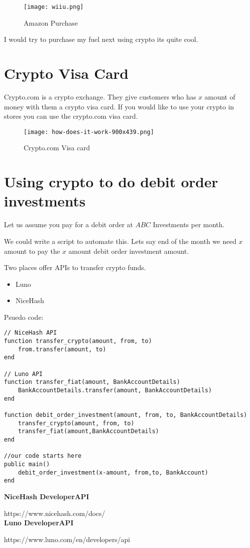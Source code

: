 \begin{figure}[H]
\centering
\texttt{[image: wiiu.png]}
\caption{Amazon Purchase}
\label{fig:amazon}
\end{figure}

I would try to purchase my fuel next using crypto its quite cool.

\section{Crypto Visa Card}
Crypto.com is a crypto exchange. They give customers who has $x$ amount of money with them a crypto visa card. If you would like to use your crypto in stores you can use the crypto.com visa card.

\begin{figure}[H]
\centering
\texttt{[image: how-does-it-work-900x439.png]}
\caption{Crypto.com Visa card}
\label{fig:crypto}
\end{figure}

\section{Using crypto to do debit order investments}
Let us assume you pay for a debit order at $ABC$ Investments per month.

We could write a script to automate this. Lets say end of the month we need $x$ amount to pay the $x$ amount debit order investment amount.

Two places offer APIs to transfer crypto funds.

\begin{itemize}
\item Luno
\item NiceHash
\end{itemize}

Psuedo code:

\begin{verbatim}
// NiceHash API
function transfer_crypto(amount, from, to)
    from.transfer(amount, to)
end

// Luno API
function transfer_fiat(amount, BankAccountDetails)
    BankAccountDetails.transfer(amount, BankAccountDetails)
end

function debit_order_investment(amount, from, to, BankAccountDetails)
    transfer_crypto(amount, from, to)
    transfer_fiat(amount,BankAccountDetails)
end

//our code starts here
public main()
    debit_order_investment(x-amount, from,to, BankAccount)
end
\end{verbatim}

\textbf{NiceHash DeveloperAPI}
 
https://www.nicehash.com/docs/ \\

\textbf{Luno DeveloperAPI}

https://www.luno.com/en/developers/api \\











